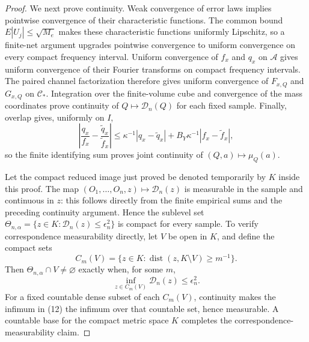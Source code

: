 \documentclass{article}
\begin{document}
\begin{proof}
We next prove continuity.  Weak convergence of error laws implies pointwise convergence of their characteristic functions.  The common bound \(E|U_j|\le\sqrt{M_e}\) makes these characteristic functions uniformly Lipschitz, so a finite-net argument upgrades pointwise convergence to uniform convergence on every compact frequency interval.  Uniform convergence of \(f_x\) and \(q_x\) on \(\mathcal A\) gives uniform convergence of their Fourier transforms on compact frequency intervals.  The paired channel factorization therefore gives uniform convergence of \(F_{x,Q}\) and \(G_{x,Q}\) on \(\mathcal C_*\).  Integration over the finite-volume cube and convergence of the mass coordinates prove continuity of \(Q\mapsto\mathscr D_n(Q)\) for each fixed sample.  Finally, overlap gives, uniformly on \(I\),
\[
\left|\frac{q_x}{f_x}-\frac{\widetilde q_x}{\widetilde f_x}\right|
\le \kappa^{-1}|q_x-\widetilde q_x|
+B_Y\kappa^{-1}|f_x-\widetilde f_x|, \tag{11}
\]
so the finite identifying sum proves joint continuity of \((Q,a)\mapsto\mu_Q(a)\).

Let the compact reduced image just proved be denoted temporarily by \(K\) inside this proof.  The map \((O_1,\ldots,O_n,z)\mapsto\mathscr D_n(z)\) is measurable in the sample and continuous in \(z\): this follows directly from the finite empirical sums and the preceding continuity argument.  Hence the sublevel set \(\Theta_{n,\alpha}=\{z\in K:\mathscr D_n(z)\le\epsilon_n^2\}\) is compact for every sample.  To verify correspondence measurability directly, let \(V\) be open in \(K\), and define the compact sets
\[
C_m(V)=\{z\in K:\operatorname{dist}(z,K\setminus V)\ge m^{-1}\}.
\]
Then \(\Theta_{n,\alpha}\cap V\ne\varnothing\) exactly when, for some \(m\),
\[
\inf_{z\in C_m(V)}\mathscr D_n(z)\le\epsilon_n^2. \tag{12}
\]
For a fixed countable dense subset of each \(C_m(V)\), continuity makes the infimum in (12) the infimum over that countable set, hence measurable.  A countable base for the compact metric space \(K\) completes the correspondence-measurability claim.


\end{proof}
\end{document}
